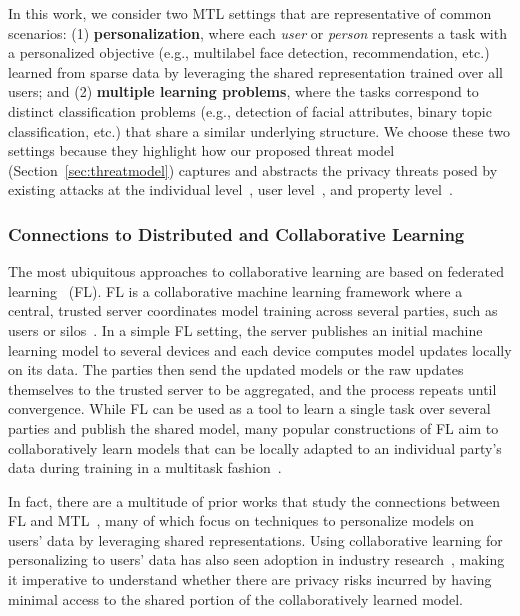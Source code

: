 In this work, we consider two MTL settings that are representative of common scenarios: (1) \textbf{personalization}, where each \emph{user} or \emph{person} represents a task with a personalized objective (e.g., multilabel face detection, recommendation, etc.) learned from sparse data by leveraging the shared representation trained over all users; and (2) \textbf{multiple learning problems}, where the tasks correspond to distinct classification problems (e.g.,  detection of facial attributes, binary topic classification, etc.) that share a similar underlying structure. We choose these two settings because they highlight how our proposed threat model (Section~\ref{sec:threatmodel}) captures and abstracts the privacy threats posed by existing attacks at the individual level~\cite{shokri-2016-mi}, user level~\cite{kandpal2023userinference}, and property level~\cite{ateniese-2015-property_inference}. 
 

\subsubsection{Connections to Distributed and Collaborative Learning}

The most ubiquitous approaches to collaborative learning are based on federated learning~\cite{mcmahan2017FLoriginal} (FL). FL is a collaborative machine learning framework where a central, trusted server coordinates model training across several parties, such as users or silos~\cite{huang2022crosssiloFL}. In a simple FL setting, the server publishes an initial machine learning model to several devices and each device computes model updates locally on its data. The parties then send the updated models or the raw updates themselves to the trusted server to be aggregated, and the process repeats until convergence. While FL can be used as a tool to learn a single task over several parties and publish the shared model, many popular constructions of FL aim to collaboratively learn models that can be locally adapted to an individual party's data during training in a multitask fashion~\cite{smith2017federated}.

In fact, there are a multitude of prior works that study the connections between FL and MTL~\cite{yu-2022-FLadaptation, tan-2023-personalizedFL, hu2023privatemtl, fallah2020personalizedfederatedlearningmetalearning, mansour2020personalization}, many of which focus on techniques to personalize models on users' data by leveraging shared representations. Using collaborative learning for personalizing to users' data has also seen adoption in industry research~\cite{msr2022PersonalizedFL}, making it imperative to understand whether there are privacy risks incurred by having minimal access to the shared portion of the collaboratively learned model.


